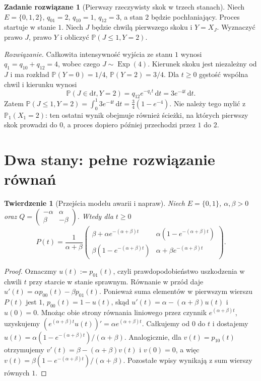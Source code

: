 \documentclass[11pt,a4paper,oneside]{report}
\numberwithin{equation}{chapter}
\theoremstyle{plain}
\newtheorem{twierdzenie}{Twierdzenie}[chapter]
\theoremstyle{definition}
\newtheorem{zadanie}{Zadanie rozwiązane}[chapter]
\theoremstyle{remark}
\newcommand{\Prob}{\mathbb{P}}
\newcommand{\dd}{\mathrm{d}}
\begin{document}
\begin{zadanie}[Pierwszy rzeczywisty skok w trzech stanach]
Niech $E=\{0,1,2\}$, $q_{01}=2$, $q_{10}=1$,
$q_{12}=3$, a stan $2$ będzie pochłaniający.
Proces startuje w stanie $1$. Niech $J$ będzie chwilą
pierwszego skoku i $Y=X_J$. Wyznaczyć prawo $J$, prawo
$Y$ i obliczyć $\Prob(J\le1,Y=2)$.

\emph{Rozwiązanie.} Całkowita intensywność wyjścia ze
stanu $1$ wynosi $q_1=q_{10}+q_{12}=4$, wobec czego
$J\sim\operatorname{Exp}(4)$. Kierunek skoku jest
niezależny od $J$ i ma rozkład
$\Prob(Y=0)=1/4$, $\Prob(Y=2)=3/4$.
Dla $t\ge0$ gęstość wspólna chwil i kierunku wynosi
\[
\Prob(J\in\dd t,Y=2)=q_{12}e^{-q_1t}\,\dd t
=3e^{-4t}\,\dd t.
\]
Zatem
$\Prob(J\le1,Y=2)=\int_0^1 3e^{-4t}\,\dd t
=\tfrac34(1-e^{-4})$.
Nie należy tego mylić z $\Prob_1(X_1=2)$:
ten ostatni wynik obejmuje również ścieżki, na których
pierwszy skok prowadzi do $0$, a proces dopiero później
przechodzi przez $1$ do $2$.
\end{zadanie}

\section{Dwa stany: pełne rozwiązanie równań}
\begin{twierdzenie}[Przejścia modelu awarii i napraw]
Niech $E=\{0,1\}$, $\alpha,\beta>0$ oraz
$Q=\left(\begin{smallmatrix}-\alpha&\alpha\\
\beta&-\beta\end{smallmatrix}\right)$.
Wtedy dla $t\ge0$
\[
P(t)=\frac1{\alpha+\beta}
\begin{pmatrix}
\beta+\alpha e^{-(\alpha+\beta)t} &
\alpha(1-e^{-(\alpha+\beta)t})\\
\beta(1-e^{-(\alpha+\beta)t})&
\alpha+\beta e^{-(\alpha+\beta)t}
\end{pmatrix}.
\]
\end{twierdzenie}
\begin{proof}
Oznaczmy $u(t):=p_{01}(t)$, czyli prawdopodobieństwo
uszkodzenia w chwili $t$ przy starcie w stanie sprawnym.
Równanie w przód daje
$u'(t)=\alpha p_{00}(t)-\beta p_{01}(t)$.
Ponieważ suma elementów w pierwszym wierszu $P(t)$ jest $1$,
$p_{00}(t)=1-u(t)$, skąd
$u'(t)=\alpha-(\alpha+\beta)u(t)$ i $u(0)=0$.
Mnożąc obie strony równania liniowego przez czynnik
$e^{(\alpha+\beta)t}$, uzyskujemy
$(e^{(\alpha+\beta)t}u(t))'=\alpha e^{(\alpha+\beta)t}$.
Całkujemy od $0$ do $t$ i dostajemy
$u(t)=\alpha(1-e^{-(\alpha+\beta)t})/(\alpha+\beta)$.
Analogicznie, dla $v(t)=p_{10}(t)$ otrzymujemy
$v'(t)=\beta-(\alpha+\beta)v(t)$ i $v(0)=0$,
a więc $v(t)=\beta(1-e^{-(\alpha+\beta)t})/(\alpha+\beta)$.
Pozostałe wpisy wynikają z sum wierszy równych $1$.
\end{proof}
\end{document}
